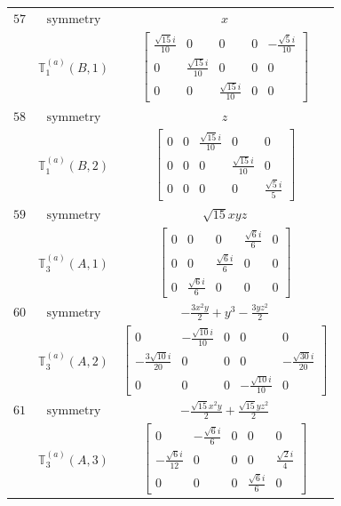 \documentclass[fleqn,8pt,landscape]{jsarticle}
\begin{document}
\begin{longtable}{ccc}
$ 57 $ & $ \text{symmetry} $ & $ x $ \\
$  $ & $ \mathbb{T}_{1}^{(a)}(B,1) $ & $ \begin{bmatrix} \frac{\sqrt{15} i}{10} & 0 & 0 & 0 & - \frac{\sqrt{5} i}{10} \\ 0 & \frac{\sqrt{15} i}{10} & 0 & 0 & 0 \\ 0 & 0 & \frac{\sqrt{15} i}{10} & 0 & 0 \end{bmatrix} $ \\ \hline
$ 58 $ & $ \text{symmetry} $ & $ z $ \\
$  $ & $ \mathbb{T}_{1}^{(a)}(B,2) $ & $ \begin{bmatrix} 0 & 0 & \frac{\sqrt{15} i}{10} & 0 & 0 \\ 0 & 0 & 0 & \frac{\sqrt{15} i}{10} & 0 \\ 0 & 0 & 0 & 0 & \frac{\sqrt{5} i}{5} \end{bmatrix} $ \\ \hline
$ 59 $ & $ \text{symmetry} $ & $ \sqrt{15} x y z $ \\
$  $ & $ \mathbb{T}_{3}^{(a)}(A,1) $ & $ \begin{bmatrix} 0 & 0 & 0 & \frac{\sqrt{6} i}{6} & 0 \\ 0 & 0 & \frac{\sqrt{6} i}{6} & 0 & 0 \\ 0 & \frac{\sqrt{6} i}{6} & 0 & 0 & 0 \end{bmatrix} $ \\ \hline
$ 60 $ & $ \text{symmetry} $ & $ - \frac{3 x^{2} y}{2} + y^{3} - \frac{3 y z^{2}}{2} $ \\
$  $ & $ \mathbb{T}_{3}^{(a)}(A,2) $ & $ \begin{bmatrix} 0 & - \frac{\sqrt{10} i}{10} & 0 & 0 & 0 \\ - \frac{3 \sqrt{10} i}{20} & 0 & 0 & 0 & - \frac{\sqrt{30} i}{20} \\ 0 & 0 & 0 & - \frac{\sqrt{10} i}{10} & 0 \end{bmatrix} $ \\ \hline
$ 61 $ & $ \text{symmetry} $ & $ - \frac{\sqrt{15} x^{2} y}{2} + \frac{\sqrt{15} y z^{2}}{2} $ \\
$  $ & $ \mathbb{T}_{3}^{(a)}(A,3) $ & $ \begin{bmatrix} 0 & - \frac{\sqrt{6} i}{6} & 0 & 0 & 0 \\ - \frac{\sqrt{6} i}{12} & 0 & 0 & 0 & \frac{\sqrt{2} i}{4} \\ 0 & 0 & 0 & \frac{\sqrt{6} i}{6} & 0 \end{bmatrix} $ \\ \hline

\end{longtable}
\end{document}
